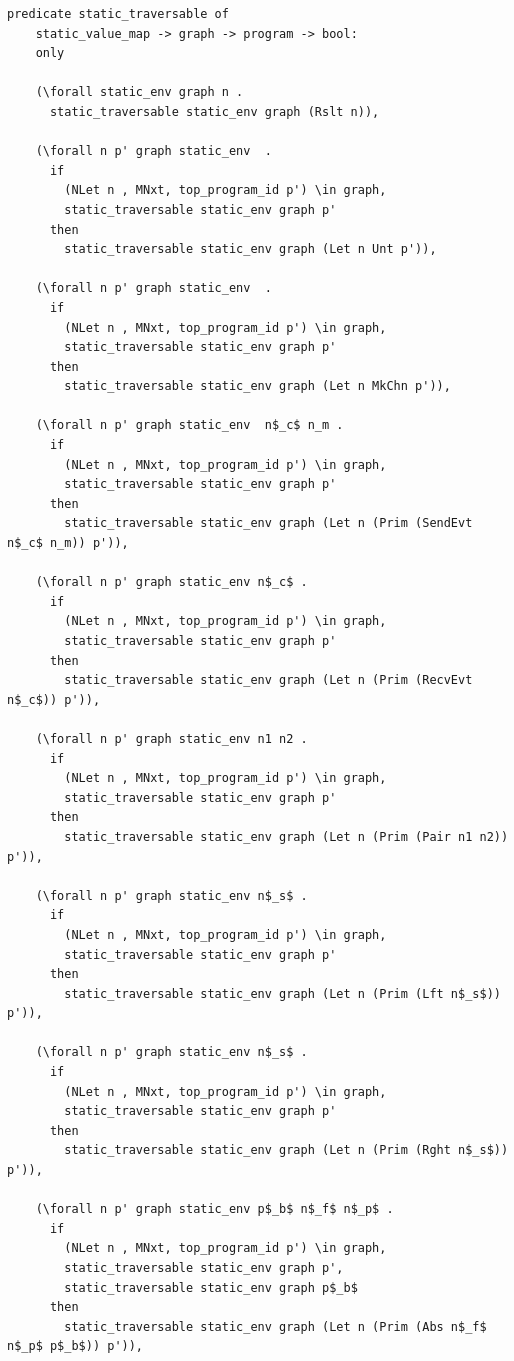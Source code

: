 \documentclass{article}
\begin{document}
\begin{lstlisting}[language=logic, mathescape]
  predicate static_traversable of
    static_value_map -> graph -> program -> bool:
    only

    (\forall static_env graph n .
      static_traversable static_env graph (Rslt n)),

    (\forall n p' graph static_env  .
      if
        (NLet n , MNxt, top_program_id p') \in graph,
        static_traversable static_env graph p'
      then
        static_traversable static_env graph (Let n Unt p')),

    (\forall n p' graph static_env  .
      if
        (NLet n , MNxt, top_program_id p') \in graph,
        static_traversable static_env graph p'
      then
        static_traversable static_env graph (Let n MkChn p')),

    (\forall n p' graph static_env  n$_c$ n_m .
      if
        (NLet n , MNxt, top_program_id p') \in graph, 
        static_traversable static_env graph p'
      then
        static_traversable static_env graph (Let n (Prim (SendEvt n$_c$ n_m)) p')),

    (\forall n p' graph static_env n$_c$ .
      if
        (NLet n , MNxt, top_program_id p') \in graph,
        static_traversable static_env graph p'
      then
        static_traversable static_env graph (Let n (Prim (RecvEvt n$_c$)) p')),

    (\forall n p' graph static_env n1 n2 .
      if
        (NLet n , MNxt, top_program_id p') \in graph,
        static_traversable static_env graph p'
      then
        static_traversable static_env graph (Let n (Prim (Pair n1 n2)) p')),

    (\forall n p' graph static_env n$_s$ .
      if
        (NLet n , MNxt, top_program_id p') \in graph,
        static_traversable static_env graph p'
      then
        static_traversable static_env graph (Let n (Prim (Lft n$_s$)) p')),

    (\forall n p' graph static_env n$_s$ .
      if
        (NLet n , MNxt, top_program_id p') \in graph,
        static_traversable static_env graph p'
      then
        static_traversable static_env graph (Let n (Prim (Rght n$_s$)) p')),

    (\forall n p' graph static_env p$_b$ n$_f$ n$_p$ .
      if
        (NLet n , MNxt, top_program_id p') \in graph,
        static_traversable static_env graph p', 
        static_traversable static_env graph p$_b$
      then
        static_traversable static_env graph (Let n (Prim (Abs n$_f$ n$_p$ p$_b$)) p')),


\end{lstlisting}
\end{document}
